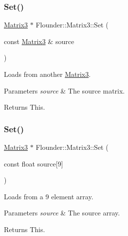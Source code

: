 \subsubsection{\texorpdfstring{Set()}{Set()}\hspace{0.1cm}{\footnotesize\ttfamily [1/2]}}
{\footnotesize\ttfamily \hyperlink{class_flounder_1_1_matrix3}{Matrix3} $\ast$ Flounder\+::\+Matrix3\+::\+Set (\begin{DoxyParamCaption}\item[{const \hyperlink{class_flounder_1_1_matrix3}{Matrix3} \&}]{source }\end{DoxyParamCaption})}



Loads from another \hyperlink{class_flounder_1_1_matrix3}{Matrix3}. 


\begin{DoxyParams}{Parameters}
{\em source} & The source matrix. \\
\hline
\end{DoxyParams}
\begin{DoxyReturn}{Returns}
This. 
\end{DoxyReturn}
\mbox{\label{class_flounder_1_1_matrix3_a07183169be41a48a950d8de7649a3346}} 
\subsubsection{\texorpdfstring{Set()}{Set()}\hspace{0.1cm}{\footnotesize\ttfamily [2/2]}}
{\footnotesize\ttfamily \hyperlink{class_flounder_1_1_matrix3}{Matrix3} $\ast$ Flounder\+::\+Matrix3\+::\+Set (\begin{DoxyParamCaption}\item[{const float}]{source\mbox{[}9\mbox{]} }\end{DoxyParamCaption})}



Loads from a 9 element array. 


\begin{DoxyParams}{Parameters}
{\em source} & The source array. \\
\hline
\end{DoxyParams}
\begin{DoxyReturn}{Returns}
This. 
\end{DoxyReturn}
\mbox{\label{class_flounder_1_1_matrix3_ac246a72e7676089a6aa05f33f732d7bc}} 
